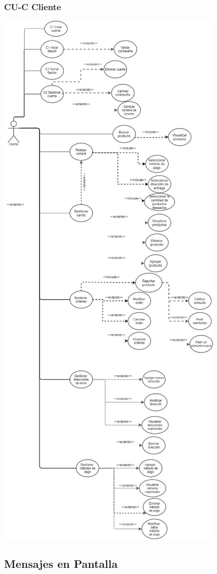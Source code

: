 \documentclass[14pt]{article}
\begin{document}
            \subsubsection{CU-C Cliente}
            \vspace{0.5cm}
            \includegraphics[height=1.3\textwidth]{CasoDeUsoCliente.jpg}
            \label{fig:CasoDeUsoCliente}
            \newpage
            
        \subsection{Mensajes en Pantalla}
\end{document}

